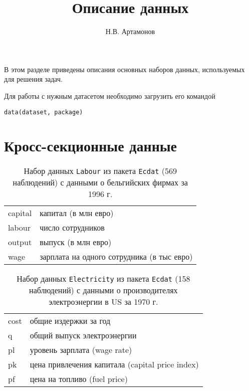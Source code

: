\documentclass[12pt]{article}
\title{Описание данных}
\author{Н.В. Артамонов}
\theoremstyle{remark}
\begin{document}
\maketitle

\tableofcontents


В этом разделе приведены описания основных наборов данных, используемых для решения задач.

Для работы с нужным датасетом необходимо загрузить его командой
\begin{verbatim}
data(dataset, package)
\end{verbatim}

\section{Кросс-секционные данные}

\begin{table}
	\caption{Набор данных \texttt{Labour}
	из пакета \texttt{Ecdat}  (569  наблюдений) с данными 
	о бельгийских 	фирмах за 1996 г.} 
	\label{BelgiumLabour}
	\begin{tabular}{l|l}\hline
	capital & капитал (в млн евро) \\
	labour & число сотрудников  \\
	output &выпуск (в млн евро) \\
	wage  & зарплата на одного сотрудника (в тыс евро)  \\
	\hline
	\end{tabular}
\end{table}

\begin{table}
	\caption{Набор данных \texttt{Electricity}
	из пакета \texttt{Ecdat}  (158  наблюдений) с данными 
	о производителях электроэнергии в US за 1970 г.} 
	\label{ElectricityEcdat}
	\begin{tabular}{l|l}\hline
	cost &  общие издержки за год \\
	q & общий выпуск электроэнергии \\
	pl & уровень зарплата (wage rate) \\
	pk & цена привлечения капитала (capital price index) \\
	pf & цена на топливо (fuel price) \\
	\hline
	\end{tabular}
\end{table}
\end{document}

